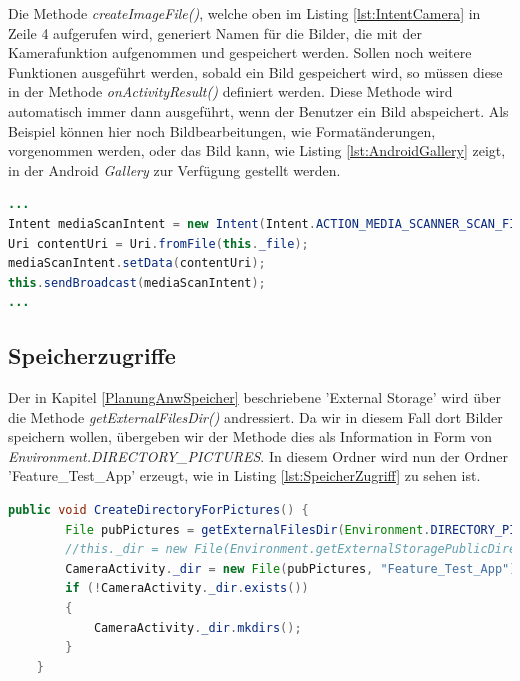 Die Methode \textit{createImageFile()}, welche oben im Listing \ref{lst:IntentCamera} in Zeile 4 aufgerufen wird, generiert Namen für die Bilder, die mit der Kamerafunktion aufgenommen und gespeichert werden. Sollen noch weitere Funktionen ausgeführt werden, sobald ein Bild gespeichert wird, so müssen diese in der Methode \textit{onActivityResult()} definiert werden. Diese Methode wird automatisch immer dann ausgeführt, wenn der Benutzer ein Bild abspeichert. Als Beispiel können hier noch Bildbearbeitungen, wie Formatänderungen, vorgenommen werden, oder das Bild kann, wie Listing \ref{lst:AndroidGallery} zeigt, in der Android \textit{Gallery} zur Verfügung gestellt werden.

\begin{lstlisting}[caption=Bereitstellen des gespeicherten Bildes für die Android \textit{Gallery}, label=lst:AndroidGallery, language=Java]
...
Intent mediaScanIntent = new Intent(Intent.ACTION_MEDIA_SCANNER_SCAN_FILE);
Uri contentUri = Uri.fromFile(this._file);
mediaScanIntent.setData(contentUri);
this.sendBroadcast(mediaScanIntent);
...
\end{lstlisting}  

\subsection*{Speicherzugriffe}

Der in Kapitel \ref{PlanungAnwSpeicher} beschriebene 'External Storage' wird über die Methode \textit{getExternalFilesDir()} andressiert. Da wir in diesem Fall dort Bilder speichern wollen, übergeben wir der Methode dies als Information in Form von \textit{Environment.DIRECTORY\_PICTURES}. In diesem Ordner wird nun der Ordner 'Feature\_Test\_App' erzeugt, wie in Listing \ref{lst:SpeicherZugriff} zu sehen ist.
\clearpage

\begin{lstlisting}[caption=Adressieren des 'External Storage' und Anlegen eines Ordners für die Fotos der Funktionstest-Anwendung, label=lst:SpeicherZugriff, language=Java]
public void CreateDirectoryForPictures() {
        File pubPictures = getExternalFilesDir(Environment.DIRECTORY_PICTURES);
        //this._dir = new File(Environment.getExternalStoragePublicDirectory(Environment.DIRECTORY_PICTURES), "FeatureTestApp");
        CameraActivity._dir = new File(pubPictures, "Feature_Test_App");
        if (!CameraActivity._dir.exists())
        {
            CameraActivity._dir.mkdirs();
        }
    }
\end{lstlisting}

